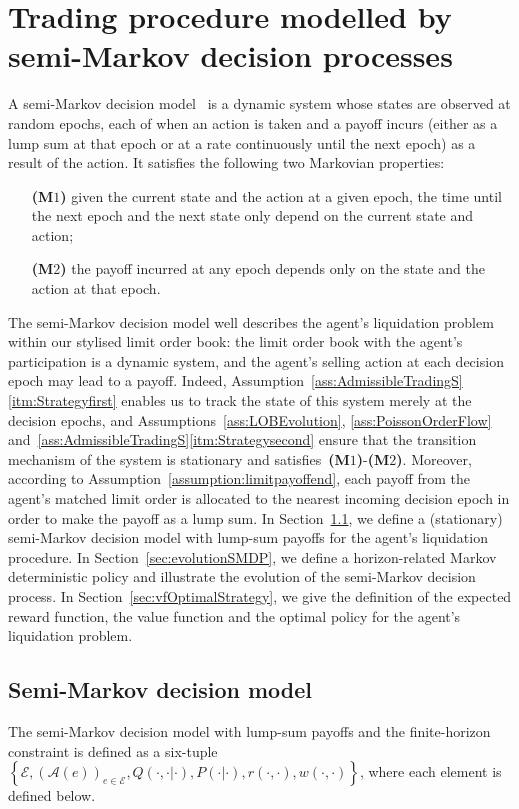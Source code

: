 \documentclass{amsart}[11pt]
\numberwithin{equation}{section}
\theoremstyle{definition}
\newcommand{\Ee}{\mathcal{E}}
\newcommand{\Aa}{\mathcal{A}}
\begin{document}
\section{Trading procedure modelled by semi-Markov decision processes}\label{sec:TradingProcedure}
A semi-Markov decision model~\cite[Chapter~7]{tijms2003first} 
is a dynamic system whose states are observed at random epochs,
each of when an action is taken and a payoff incurs
(either as a lump sum at that epoch or at a rate continuously until the next epoch)
as a result of the action.
It satisfies the following two Markovian properties:
\begin{enumerate}
\item[\textbf{(M$1$)}] given the current state and the action at a given epoch,
 the time until the next epoch and the next state only depend on the current state and action;
\item[\textbf{(M$2$)}] the payoff incurred at any epoch depends only on the state and the action at that epoch.
\end{enumerate}
The semi-Markov decision model well describes the agent's liquidation problem within our stylised limit order book:
the limit order book with the agent's participation is a dynamic system, 
and the agent's selling action at each decision epoch may lead to a payoff.
Indeed, Assumption~\ref{ass:AdmissibleTradingS}\eqref{itm:Strategyfirst} enables us to track the state of this system merely at the decision epochs, 
and Assumptions~\ref{ass:LOBEvolution}, \ref{ass:PoissonOrderFlow} and~\ref{ass:AdmissibleTradingS}\eqref{itm:Strategysecond}
ensure that the transition mechanism of the system is stationary and satisfies~\textbf{(M$1$)}-\textbf{(M$2$)}.
Moreover, according to Assumption~\ref{assumption:limitpayoffend},
each payoff from the agent's matched limit order is allocated to the nearest incoming decision epoch
in order to make the payoff as a lump sum. 
In Section~\ref{sec:IntoSMDP}, we define a (stationary) semi-Markov decision model with lump-sum payoffs for the agent's liquidation procedure.
In Section~\ref{sec:evolutionSMDP}, we define a horizon-related Markov deterministic policy and illustrate the evolution of the semi-Markov decision process.
In Section~\ref{sec:vfOptimalStrategy}, we give the definition of the expected reward function, the value function and the optimal policy for the agent's liquidation problem.

\subsection{Semi-Markov decision model}\label{sec:IntoSMDP}
The semi-Markov decision model with lump-sum payoffs and the finite-horizon constraint is defined as a six-tuple
$\left\{\Ee, (\Aa(e))_{e\in \Ee}, Q(\cdot, \cdot\lvert \cdot), P(\cdot\lvert\cdot), r(\cdot, \cdot), w(\cdot, \cdot)\right\}$,
where each element is defined below.
\end{document}
